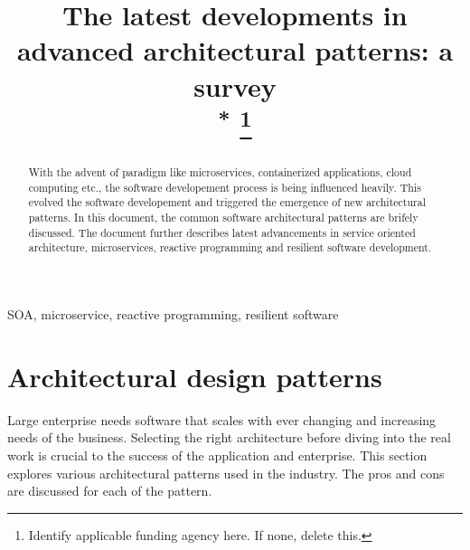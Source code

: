 \documentclass[conference]{IEEEtran}
\begin{document}
\title{The latest developments in advanced architectural patterns: a survey\\
{\footnotesize \textsuperscript{*}}
\thanks{Identify applicable funding agency here. If none, delete this.}
}

\author{
\and
{}
}

\maketitle

\begin{abstract}
With the advent of paradigm like microservices, containerized applications, cloud computing etc., the software developement process is being influenced heavily. This evolved the software developement and triggered the emergence of new architectural patterns. In this document, the common software architectural patterns are brifely discussed. The document further describes latest advancements in service oriented architecture, microservices, reactive programming and resilient software development.
\end{abstract}

\begin{IEEEkeywords}
SOA, microservice, reactive programming, resilient software
\end{IEEEkeywords}

\section{Architectural design patterns}
Large enterprise needs software that scales with ever changing and increasing needs of the business. Selecting the right architecture before diving into the real work is crucial to the success of the application and enterprise. This section explores various architectural patterns used in the industry. The pros and cons are discussed for each of the pattern.
\end{document}

